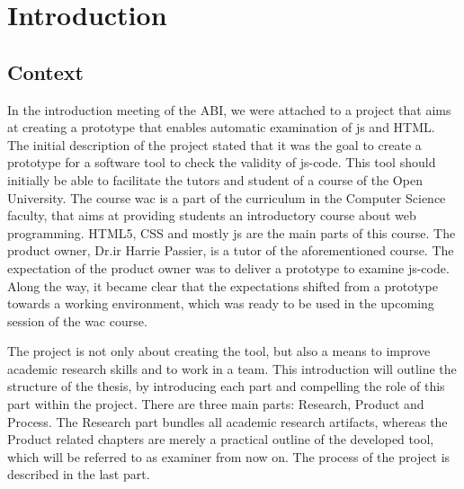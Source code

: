 \chapter{Introduction}



\section{Context} 

In the introduction meeting of the ABI, we were attached to a project that aims 
at creating a prototype that enables automatic
examination of \gls{js} and HTML. The initial description of the project stated 
that it was the goal to create a prototype for a software tool to 
check the validity of \gls{js-code}. This tool should initially be able to
facilitate the tutors and student of a course of the Open University.
The course \gls{wac} is a part of the curriculum in the Computer Science faculty,
that aims at providing students an introductory course about web programming.
HTML5, CSS and mostly \gls{js} are the main parts of this course.
The product owner, Dr.ir Harrie Passier, is a tutor of the aforementioned course.
The expectation of the product owner was to deliver a prototype to examine 
\gls{js-code}. Along the way, it became clear that the expectations
shifted from a prototype towards a working environment, which was ready to be 
used in the upcoming session of the \gls{wac} course.


The project is not only about creating the tool, but also a means to 
improve academic research skills and to work in a team. This introduction will 
outline the structure of the thesis, by introducing each part and compelling the 
role of this part within the project. There are three main parts: Research, 
Product and Process. The Research part bundles all academic research artifacts, 
whereas the Product related chapters are merely a practical outline of the 
developed tool, which will be referred to as \gls{examiner} from now on. The 
process of the project is described in the last part.

